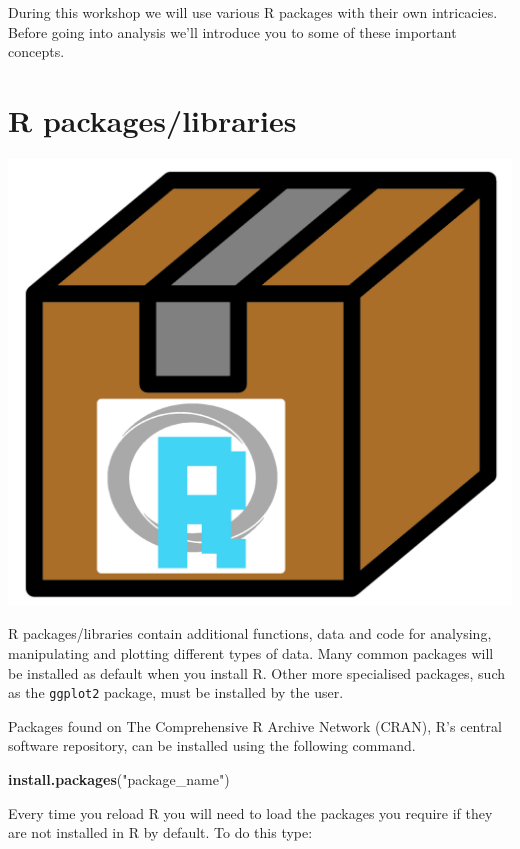 \documentclass[
]{book}
\newenvironment{Shaded}{\begin{snugshade}}{\end{snugshade}}
\newcommand{\FunctionTok}[1]{\textcolor[rgb]{0.13,0.29,0.53}{\textbf{#1}}}
\newcommand{\NormalTok}[1]{#1}
\newcommand{\StringTok}[1]{\textcolor[rgb]{0.31,0.60,0.02}{#1}}
\begin{document}
During this workshop we will use various R packages with their own intricacies. Before going into analysis we'll introduce you to some of these important concepts.

\hypertarget{r-packageslibraries}{%
\section{R packages/libraries}\label{r-packageslibraries}}

\includegraphics{figures/r_package.png}

R packages/libraries contain additional functions, data and code for analysing, manipulating and plotting different types of data. Many common packages will be installed as default when you install R. Other more specialised packages, such as the \texttt{ggplot2} package, must be installed by the user.

Packages found on The Comprehensive R Archive Network (CRAN), R's central software repository, can be installed using the following command.

\begin{Shaded}
\begin{Highlighting}[]
\FunctionTok{install.packages}\NormalTok{(}\StringTok{"package\_name"}\NormalTok{)}
\end{Highlighting}
\end{Shaded}

Every time you reload R you will need to load the packages you require if they are not installed in R by default. To do this type:
\end{document}
